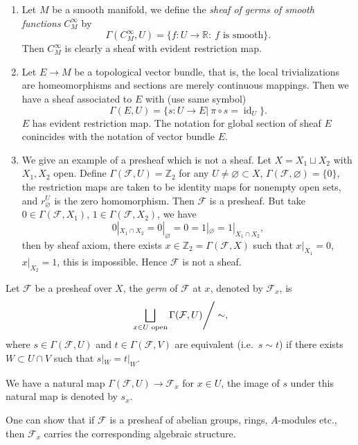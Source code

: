 \begin{eg}
    \begin{enumerate}[(1)]
        \item Let $M$ be a smooth manifold, we define the \emph{sheaf of germs of smooth functions} $C^\infty_M$ by
        \[\Gamma(C^\infty_M,U)=\{f:U\to\mathbb{R}:\ f\text{ is smooth}\}.\]
        Then $C^\infty_M$ is clearly a sheaf with evident restriction map.
        \item Let $E\to M$ be a topological vector bundle, that is, the local trivializations are homeomorphisms and sections are merely continuous mappings.
        Then we have a sheaf associated to $E$ with (use same symbol)
        \[\Gamma(E,U)=\{s:U\to E|\ \pi\circ s=\operatorname{id}_U\}.\]
        $E$ has evident restriction map.
        The notation for global section of sheaf $E$ conincides with the notation of vector bundle $E$.
        \item We give an example of a presheaf which is not a sheaf.
        Let $X=X_1\sqcup X_2$ with $X_1,X_2$ open.
        Define $\Gamma(\mathcal{F},U)=\mathbb{Z}_2$ for any $U\neq\varnothing\subset X$, $\Gamma(\mathcal{F},\varnothing)=\{0\}$, the restriction maps are taken to be identity maps for nonempty open sets, and $r^U_\varnothing$ is the zero homomorphism.
        Then $\mathcal{F}$ is a presheaf.
        But take $0\in\Gamma(\mathcal{F},X_1)$, $1\in\Gamma(\mathcal{F},X_2)$, we have
        \[0|_{X_1\cap X_2}=0|_\varnothing=0=1|_\varnothing=1|_{X_1\cap X_2},\]
        then by sheaf axiom, there exists $x\in\mathbb{Z}_2=\Gamma(\mathcal{F},X)$ such that $x|_{X_1}=0$, $x|_{X_2}=1$, this is impossible.
        Hence $\mathcal{F}$ is not a sheaf.
    \end{enumerate}
\end{eg}

\begin{defn}
    Let $\mathcal{F}$ be a presheaf over $X$, the \emph{germ} of $\mathcal{F}$ at $x$, denoted by $\mathcal{F}_x$, is
    \[\left.\bigsqcup_{x\in U\text{ open}}\Gamma(\mathcal{F},U)\right/\sim,\]
    where $s\in\Gamma(\mathcal{F},U)$ and $t\in\Gamma(\mathcal{F},V)$ are equivalent (i.e.\ $s\sim t$) if there exists $W\subset U\cap V$ such that $s|_W=t|_W$.

    We have a natural map $\Gamma(\mathcal{F},U)\to\mathcal{F}_x$ for $x\in U$, the image of $s$ under this natural map is denoted by $s_x$.
\end{defn}

\begin{rem}
    One can show that if $\mathcal{F}$ is a presheaf of abelian groups, rings, $A$-modules etc., then $\mathcal{F}_x$ carries the corresponding algebraic structure.
\end{rem}

